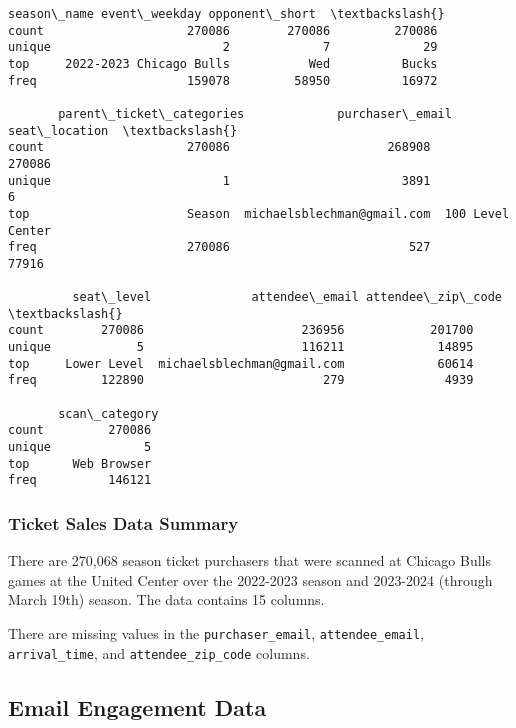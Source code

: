 \documentclass[11pt]{article}
\makeatletter
\newcommand{\boxspacing}{\kern\kvtcb@left@rule\kern\kvtcb@boxsep}
\newcommand{\prompt}[4]{
        {\ttfamily\llap{{\color{#2}[#3]:\hspace{3pt}#4}}\vspace{-\baselineskip}}
    }
\makeatother
\begin{document}
            \begin{tcolorbox}[breakable, size=fbox, boxrule=.5pt, pad at break*=1mm, opacityfill=0]
\prompt{Out}{outcolor}{7}{\boxspacing}
\begin{Verbatim}[commandchars=\\\{\}]
                    season\_name event\_weekday opponent\_short  \textbackslash{}
count                    270086        270086         270086
unique                        2             7             29
top     2022-2023 Chicago Bulls           Wed          Bucks
freq                     159078         58950          16972

       parent\_ticket\_categories             purchaser\_email     seat\_location  \textbackslash{}
count                    270086                      268908            270086
unique                        1                        3891                 6
top                      Season  michaelsblechman@gmail.com  100 Level Center
freq                     270086                         527             77916

         seat\_level              attendee\_email attendee\_zip\_code  \textbackslash{}
count        270086                      236956            201700
unique            5                      116211             14895
top     Lower Level  michaelsblechman@gmail.com             60614
freq         122890                         279              4939

       scan\_category
count         270086
unique             5
top      Web Browser
freq          146121
\end{Verbatim}
\end{tcolorbox}
        
    \subsubsection{Ticket Sales Data
Summary}\label{ticket-sales-data-summary}

There are 270,068 season ticket purchasers that were scanned at Chicago
Bulls games at the United Center over the 2022-2023 season and 2023-2024
(through March 19th) season. The data contains 15 columns.

There are missing values in the \texttt{purchaser\_email},
\texttt{attendee\_email}, \texttt{arrival\_time}, and
\texttt{attendee\_zip\_code} columns.

    

    \subsection{Email Engagement Data}\label{email-engagement-data}
\end{document}
